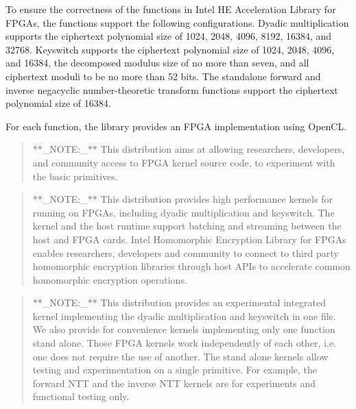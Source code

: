 To ensure the correctness of the functions in Intel H\-E Acceleration Library for F\-P\-G\-As, the functions support the following configurations. Dyadic multiplication supports the ciphertext polynomial size of 1024, 2048, 4096, 8192, 16384, and 32768. Keyswitch supports the ciphertext polynomial size of 1024, 2048, 4096, and 16384, the decomposed modulus size of no more than seven, and all ciphertext moduli to be no more than 52 bits. The standalone forward and inverse negacyclic number-\/theoretic transform functions support the ciphertext polynomial size of 16384.

For each function, the library provides an F\-P\-G\-A implementation using Open\-C\-L.

\begin{quotation}
$\ast$$\ast$\-\_\-\-N\-O\-T\-E\-:\-\_\-$\ast$$\ast$ This distribution aims at allowing researchers, developers, and community access to F\-P\-G\-A kernel source code, to experiment with the basic primitives.

\end{quotation}


\begin{quotation}
$\ast$$\ast$\-\_\-\-N\-O\-T\-E\-:\-\_\-$\ast$$\ast$ This distribution provides high performance kernels for running on F\-P\-G\-As, including dyadic multiplication and keyswitch. The kernel and the host runtime support batching and streaming between the host and F\-P\-G\-A cards. Intel Homomorphic Encryption Library for F\-P\-G\-As enables researchers, developers and community to connect to third party homomorphic encryption libraries through host A\-P\-Is to accelerate common homomorphic encryption operations.

\end{quotation}


\begin{quotation}
$\ast$$\ast$\-\_\-\-N\-O\-T\-E\-:\-\_\-$\ast$$\ast$ This distribution provides an experimental integrated kernel implementing the dyadic multiplication and keyswitch in one file. We also provide for convenience kernels implementing only one function stand alone. Those F\-P\-G\-A kernels work independently of each other, i.\-e. one does not require the use of another. The stand alone kernels allow testing and experimentation on a single primitive. For example, the forward N\-T\-T and the inverse N\-T\-T kernels are for experiments and functional testing only.

\end{quotation}


